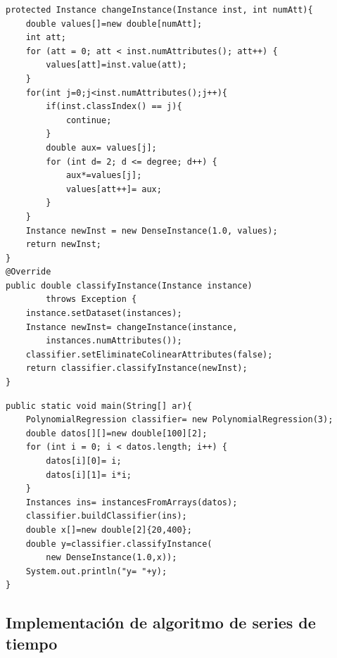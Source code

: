 \begin{lstlisting}[frame=single]  
protected Instance changeInstance(Instance inst, int numAtt){
	double values[]=new double[numAtt];
	int att;
	for (att = 0; att < inst.numAttributes(); att++) {
		values[att]=inst.value(att);
	}
	for(int j=0;j<inst.numAttributes();j++){
		if(inst.classIndex() == j){
			continue;
		}
		double aux= values[j];
		for (int d= 2; d <= degree; d++) {
			aux*=values[j];
			values[att++]= aux;
		}
	}
	Instance newInst = new DenseInstance(1.0, values);
	return newInst;
}
@Override
public double classifyInstance(Instance instance) 
		throws Exception {
	instance.setDataset(instances);
	Instance newInst= changeInstance(instance,
		instances.numAttributes());
	classifier.setEliminateColinearAttributes(false);
	return classifier.classifyInstance(newInst);
}
\end{lstlisting}





\begin{lstlisting}[frame=single]  
public static void main(String[] ar){
	PolynomialRegression classifier= new PolynomialRegression(3);
   	double datos[][]=new double[100][2];
  	for (int i = 0; i < datos.length; i++) {
		datos[i][0]= i;
		datos[i][1]= i*i;
	}
   	Instances ins= instancesFromArrays(datos);
   	classifier.buildClassifier(ins);
   	double x[]=new double[2]{20,400};
   	double y=classifier.classifyInstance(
   		new DenseInstance(1.0,x));
   	System.out.println("y= "+y);   	
}
\end{lstlisting}

\subsection{Implementación de algoritmo de series de tiempo} \label{subsec:implementacionSeries}

